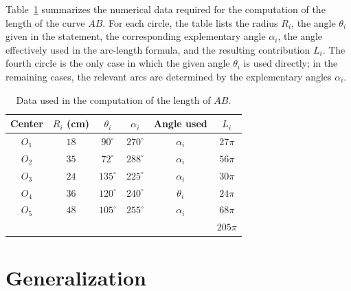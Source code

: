 \documentclass[a4paper,12pt,oneside]{article}
\numberwithin{equation}{section}
\def\ni{\noindent}
\numberwithin{equation}{section}
\begin{document}
\ni
Table~\ref{tab:data} summarizes the numerical data required for the computation of the length of the curve $AB$. For each circle, the table lists the radius $R_i$, the angle $\theta_i$ given in the statement, the corresponding explementary angle $\alpha_i$, the angle effectively used in the arc-length formula, and the resulting contribution $L_i$. The fourth circle is the only case in which the given angle $\theta_i$ is used directly; in the remaining cases, the relevant arcs are determined by the explementary angles $\alpha_i$. 
\begin{table}[ht]
\centering
\caption{Data used in the computation of the length of $AB$.}
\label{tab:data}
\begin{tabular}{c c c c c c}
\hline
Center & $R_i$ (cm) & $\theta_i$ & $\alpha_i$ & Angle used & $L_i$ \\
\hline
$O_1$ & $18$ & $90^\circ$  & $270^\circ$ & $\alpha_i$ & $27\pi$ \\
$O_2$ & $35$ & $72^\circ$  & $288^\circ$ & $\alpha_i$ & $56\pi$ \\
$O_3$ & $24$ & $135^\circ$ & $225^\circ$ & $\alpha_i$ & $30\pi$ \\
$O_4$ & $36$ & $120^\circ$ & $240^\circ$ & $\theta_i$ & $24\pi$ \\
$O_5$ & $48$ & $105^\circ$ & $255^\circ$ & $\alpha_i$ & $68\pi$ \\
\hline
\multicolumn{5}{l}{} & $205\pi$ \\
\hline
\end{tabular}
\end{table}


\section{Generalization}
\end{document}
